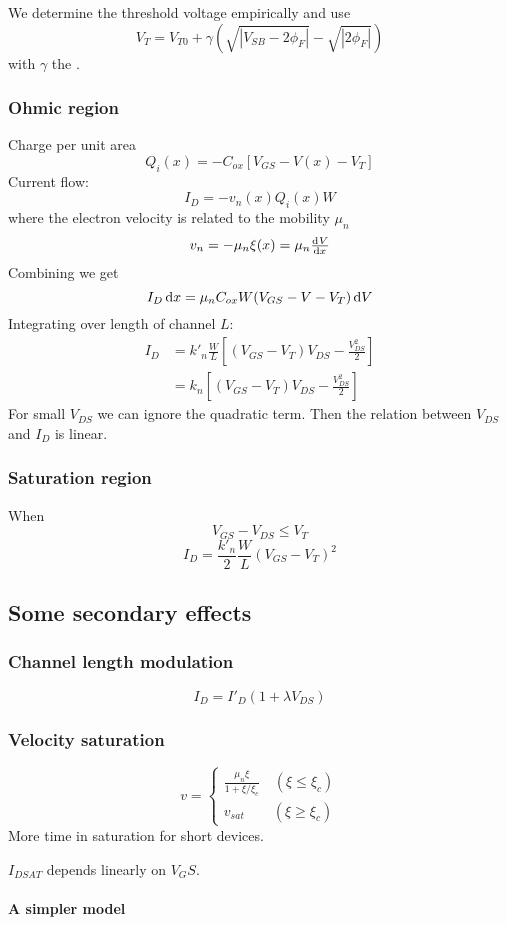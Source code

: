 \documentclass{report}
\begin{document}
We determine the threshold voltage empirically and use
\[ V_T = V_{T0} + \gamma(\sqrt{|V_{SB} - 2\phi_F|}-\sqrt{|2\phi_F|}) \]
with $\gamma$ the .

\subsubsection{Ohmic region}
Charge per unit area
\[ Q_i(x) = -C_{ox}[V_{GS}-V(x) - V_T] \]
Current flow:
\[ I_D = -v_n(x)Q_i(x)W \]
where the electron velocity is related to the mobility $\mu_n$
\[ v_n = -\mu_n \xi(x) = \mu_n \od{V}{x} \]
Combining we get
\[ I_D \operatorname{d \!}{x} = \mu_nC_{ox}W(V_{GS}-V-V_T)\operatorname{d \!}{V} \]
Integrating over length of channel $L$:
\begin{align*}
I_D &= k'_n \frac{W}{L}\left[(V_{GS}-V_T)V_{DS} - \frac{V_{DS}^2}{2}\right] \\
&= k_n\left[(V_{GS}-V_T)V_{DS} - \frac{V_{DS}^2}{2}\right]
\end{align*}
For small $V_{DS}$ we can ignore the quadratic term. Then the relation between $V_{DS}$ and $I_D$ is linear.

\subsubsection{Saturation region}
When
\[ V_{GS} - V_{DS} \leq V_T \]
\[ I_D = \frac{k'_n}{2}\frac{W}{L}(V_{GS}-V_T)^2 \]

\subsection{Some secondary effects}
\subsubsection{Channel length modulation}
\[ I_D = I'_D(1+\lambda V_{DS}) \]
\subsubsection{Velocity saturation}
\[ v = \begin{cases}
\frac{\mu_n \xi}{1 + \xi/\xi_c} \quad (\xi \leq \xi_c) \\
v_{sat} \qquad (\xi \geq \xi_c)
\end{cases} \]
More time in saturation for short devices.

$I_{DSAT}$ depends linearly on $V_GS$.

\paragraph{A simpler model}
\end{document}
